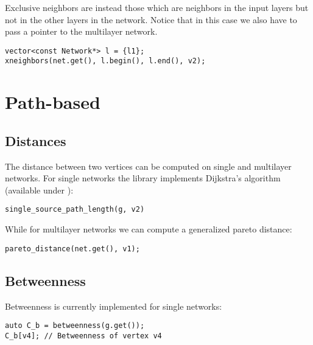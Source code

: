 Exclusive neighbors are instead those which are neighbors in the input layers but not in the other layers in the network. Notice that in this case we also have to pass a pointer to the multilayer network.
\begin{lstlisting}[style=c++] 
vector<const Network*> l = {l1};
xneighbors(net.get(), l.begin(), l.end(), v2);
\end{lstlisting}

\section{Path-based}

\subsection{Distances}

The distance between two vertices can be computed on single and multilayer networks. For single networks the library implements Dijkstra's algorithm (available under ):
\begin{lstlisting}[style=c++] 
single_source_path_length(g, v2)
\end{lstlisting}

While for multilayer networks we can compute a generalized pareto distance:
\begin{lstlisting}[style=c++] 
pareto_distance(net.get(), v1);
\end{lstlisting}




    
\subsection{Betweenness}

Betweenness is currently implemented for single networks:
\begin{lstlisting}[style=c++]
auto C_b = betweenness(g.get());
C_b[v4]; // Betweenness of vertex v4
\end{lstlisting}

